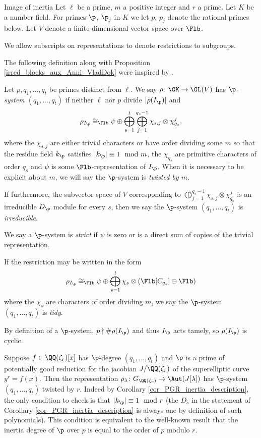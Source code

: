 \documentclass[11pt,a4paper]{article}
\newcommand{\Qr}{{\QQ(\zeta_r)}}
\newcommand{\GQr}{G_{\QQ(\zeta_{r})}}
\begin{document}
\begin{section}{Image of inertia}
\label{section_image_of_inertia}
Let $\ell$ be a prime, $m$ a positive integer and $r$ a prime. Let $K$ be a number field. For primes $\p$, $\p_j$ in $K$ we let $p$, $p_j$ denote the rational primes below.
Let $V$ denote a finite dimensional vector space over $\Flb$. 

We allow subscripts on representations to denote restrictions to subgroups.

The following definition along with Proposition \ref{irred_blocks_aux_Anni_VladDok} were inspired by \cite[Proposition 3.1]{Anni_VDok}.

\begin{definition}
Let $p,q_1, \ldots, q_t$ be primes distinct from $\ell$. We say $\rho\colon \GK \rightarrow \GL(V)$ has \emph{$\p$-system $(q_1, \ldots, q_t)$} if
 neither $\ell$ nor $p$ divide  $|\rho(I_\p)|$ and
$$\rho_{I_\p} \cong_{\Flb} \psi \oplus \bigoplus_{s=1}^{t} \bigoplus_{j=1}^{q_s-1} \chi_{s,j} \otimes \chi_{q_s}^{j},$$
where the $\chi_{s,j}$ are either trivial characters or have order dividing some $m$ so that the residue field $k_\p$ satisfies $|k_\p| \equiv 1 \mod{m}$, the $\chi_{q_s}$ are primitive characters of order $q_s$ and $\psi$ is some $\Flb$-representation of $I_\p$.
When it is necessary to be explicit about $m$, we will say the $\p$-system is \emph{twisted by $m$}.

If furthermore, the subvector space of $V$ corresponding to $\bigoplus_{j=1}^{q_s-1} \chi_{s,j} \otimes \chi_{q_s}^{j}$ is an irreducible $D_\p$ module for every $s$, then we say the $\p$-system $(q_1, \ldots, q_t)$ is \emph{irreducible}.

We say a $\p$-system is \emph{strict} if $\psi$ is zero or is a direct sum of copies of the trivial representation.

If the restriction may be written in the form \[\rho_{I_\p} \cong_{\Flb} \psi \oplus \bigoplus_{s=1}^{t} \chi_{s} \otimes (\Flb[C_{q_s}] \ominus \Flb)
\]
where the $\chi_{s}$ are characters of order dividing $m$, we say the $\p$-system $(q_1, \ldots, q_t)$ is \emph{tidy}.
\end{definition}

\begin{remark}
By definition of a $\p$-system, $p \nmid \#\rho(I_\p)$ and thus $I_\p$ acts tamely, so $\rho(I_\p)$ is cyclic. 
\end{remark}

\begin{remark}
Suppose $f \in \Qr[x]$ has $\p$-degree $(q_1,\ldots,q_t)$ and $\p$ is a prime of potentially good reduction for the jacobian $J/\Qr$ of the superelliptic curve $y^r=f(x)$.
Then the representation $\rho_\lambda \colon \GQr \rightarrow \Aut(J[\lambda])$ has $\p$-system $(q_1,\ldots,q_t)$ twisted by $r$.
Indeed by Corollary \ref{cor_PGR_inertia_description}, the only condition to check is that $|k_\p|\equiv 1 \mod{r}$ (the $D_s$ in the statement of Corollary \ref{cor_PGR_inertia_description} is always one by definition of such polynomials).
This condition is equivalent to the well-known result that the inertia degree of $\p$ over $p$ is equal to the order of $p$ modulo $r$.
\end{remark}


\end{section}
\end{document}
